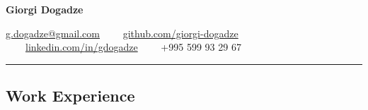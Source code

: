 \documentclass[10pt,letterpaper]{article}
\begin{document}
 
\begin{center}
{\huge \textbf{Giorgi Dogadze}}


\vspace{1em}

\href{mailto:g.dogadze@gmail.com}{g.dogadze@gmail.com} 
\ \ \textbullet \ \ 
\href{https://github.com/giorgi-dogadze}{github.com/giorgi-dogadze} 
\ \ \textbullet \ \ 
\href{https://www.linkedin.com/in/gdogadze/}{linkedin.com/in/gdogadze}
\ \ \textbullet \ \ 
+995 599 93 29 67\end{center}


\hrule
\vspace{-1.0em}
\subsection*{Work Experience}
\end{document}
